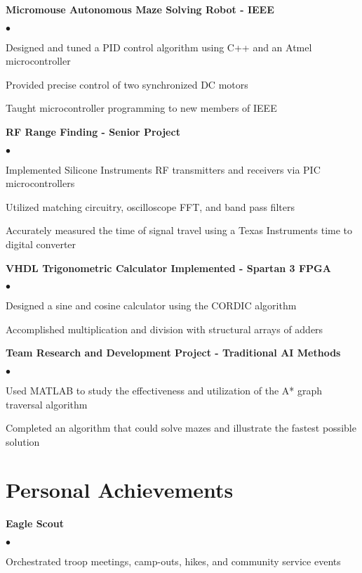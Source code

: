 \documentclass[margin,line]{res}
\newenvironment{list2}{
  \begin{list}{$\bullet$}{%
      \setlength{\itemsep}{0in}
      \setlength{\parsep}{0in} \setlength{\parskip}{0in}
      \setlength{\topsep}{0in} \setlength{\partopsep}{0in}
      \setlength{\leftmargin}{0.2in}}}{\end{list}}
\begin{document}
\begin{resume}
{\bf Micromouse Autonomous Maze Solving Robot - IEEE}
\begin{list2}
\item Designed and tuned a PID control algorithm using C++ and an Atmel microcontroller 
\item Provided precise control of two synchronized DC motors
\item Taught microcontroller programming to new members of IEEE 
\end{list2}


{\bf RF Range Finding - Senior Project}
\begin{list2}
\item Implemented Silicone Instruments RF transmitters and receivers via PIC microcontrollers
\item Utilized matching circuitry, oscilloscope FFT, and band pass filters 
\item Accurately measured the time of signal travel using a Texas Instruments time to digital converter 
\end{list2}


{\bf VHDL Trigonometric Calculator Implemented - Spartan 3 FPGA}
\begin{list2}
\item Designed a sine and cosine calculator using the CORDIC algorithm
\item Accomplished multiplication and division with structural arrays of adders
\end{list2}


{\bf Team Research and Development Project - Traditional AI Methods}
\begin{list2}
\item Used MATLAB to study the effectiveness and utilization of the A* graph traversal algorithm 
\item Completed an algorithm that could solve mazes and illustrate the fastest possible solution
\end{list2}

\section{\sc Personal Achievements}
{\bf Eagle Scout}
\begin{list2}
\item Orchestrated troop meetings, camp-outs, hikes, and community service events  
\end{list2}


\end{resume}
\end{document}
